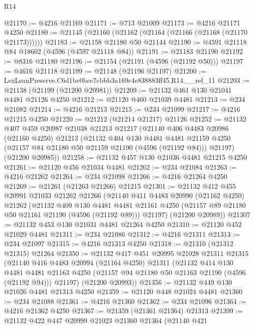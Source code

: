 \begin{lexlean}{R14}
\begin{coremodule}
@21170 := @4216 @21169
@21171 := @713 @21009
@21173 := @4216 @21171 @4250
@21180 := @21145 (@21160 (@21162 (@21164 (@21166 (@21168 (@21170 @21173))))))
@21183 := @21158 @21180 @50 @21144
@21190 := @4591 @21118 @84 @18602 (@4596 (@4597 @21118 @84))
@21191 := @21183 @21190
@21192 := @8316 @21180
@21196 := @21154 (@21191 (@4596 (@21192 @50)))
@21197 := @4616 @21118
@21199 := @21148 (@21196 @21197)
@21200 := LexLeanPreserve.C6d1bc0bcc7cbbb3a169c4e838883ff45.R14.__rel_11
@21203 := @21138 (@21199 (@21200 @20981))
@21209 := @21132 @461 @130 @21041 @4481 @21126 @4250
@21212 := @21120 @460 @21039 @4481
@21213 := @234 @21082
@21214 := @4216 @21213
@21215 := @234 @21099
@21217 := @4216 @21215 @4250
@21220 := @21212 (@21214 @21217) @21126
@21252 := @21132
    @407
    @459
    @20987
    @21038
    @21213
    @21217
    (@21140
      @406
      @4483
      @20986
      (@21160 @4250)
      @21213
      (@21132
        @404
        @130
        @4481
        @4481
        @21159
        @4250
        (@21157 @84 @21180 @50 @21159 @21190 (@4596 (@21192 @84)))
        @21197)
      (@21200 @20985))
@21258 := @21132 @457 @130 @21036 @4481 @21215 @4250
@21261 := @21120 @456 @21034 @4481
@21262 := @234 @21084
@21263 := @4216 @21262
@21264 := @234 @21098
@21266 := @4216 @21264 @4250
@21269 := @21261 (@21263 @21266) @21215
@21301 := @21132
    @412
    @455
    @20991
    @21033
    @21262
    @21266
    (@21140
      @411
      @4483
      @20990
      (@21162 @4250)
      @21262
      (@21132
        @409
        @130
        @4481
        @4481
        @21161
        @4250
        (@21157 @89 @21180 @50 @21161 @21190 (@4596 (@21192 @89)))
        @21197)
      (@21200 @20989))
@21307 := @21132 @453 @130 @21031 @4481 @21264 @4250
@21310 := @21120 @452 @21029 @4481
@21311 := @234 @21086
@21312 := @4216 @21311
@21313 := @234 @21097
@21315 := @4216 @21313 @4250
@21318 := @21310 (@21312 @21315) @21264
@21350 := @21132
    @417
    @451
    @20995
    @21028
    @21311
    @21315
    (@21140
      @416
      @4483
      @20994
      (@21164 @4250)
      @21311
      (@21132
        @414
        @130
        @4481
        @4481
        @21163
        @4250
        (@21157 @94 @21180 @50 @21163 @21190 (@4596 (@21192 @94)))
        @21197)
      (@21200 @20993))
@21356 := @21132 @449 @130 @21026 @4481 @21313 @4250
@21359 := @21120 @448 @21024 @4481
@21360 := @234 @21088
@21361 := @4216 @21360
@21362 := @234 @21096
@21364 := @4216 @21362 @4250
@21367 := @21359 (@21361 @21364) @21313
@21399 := @21132
    @422
    @447
    @20999
    @21023
    @21360
    @21364
    (@21140
      @421

\end{coremodule}
\end{lexlean}
